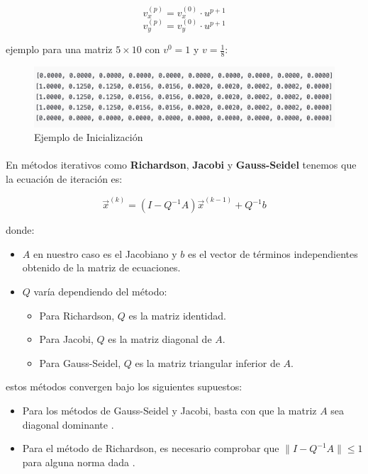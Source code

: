\documentclass{article}
\begin{document}
  \[v_x^{(p)}=v_x^{(0)}\cdot u^{p+1}\]
  \[v_y^{(p)}=v_y^{(0)}\cdot u^{p+1}\]

  ejemplo para una matriz $5\times10$ con $v^0=1$ y $v=\frac{1}{8}$:
  
  \begin{figure}[H]
    \centering
    \includegraphics[width=1\textwidth]{initVxVyExample.png}
    \caption{Ejemplo de Inicialización}
  \end{figure}

  \paragraph{}
  En métodos iterativos como \textbf{Richardson}, \textbf{Jacobi} y \textbf{Gauss-Seidel} tenemos que la ecuación de iteración es:

  \[
  \vec{x}^{(k)}=(I-Q^{-1}A)\vec{x}^{(k-1)}+Q^{-1}b
  \]

  donde:
  \begin{itemize}
      \item $A$ en nuestro caso es el Jacobiano y $b$ es el vector de términos independientes obtenido de la matriz de ecuaciones.
      \item $Q$ varía dependiendo del método:
      \begin{itemize}
          \item Para Richardson, $Q$ es la matriz identidad.
          \item Para Jacobi, $Q$ es la matriz diagonal de $A$.
          \item Para Gauss-Seidel, $Q$ es la matriz triangular inferior de $A$.
      \end{itemize}
  \end{itemize}

  estos métodos convergen bajo los siguientes supuestos:
  \begin{itemize}
    \item Para los métodos de Gauss-Seidel y Jacobi, basta con que la matriz $A$ sea diagonal dominante \cite{kincaid2}.
    \item Para el método de Richardson, es necesario comprobar que $\|I-Q^{-1}A\| \leq 1$ para alguna norma dada \cite{kincaid2}.
  \end{itemize}
\end{document}
